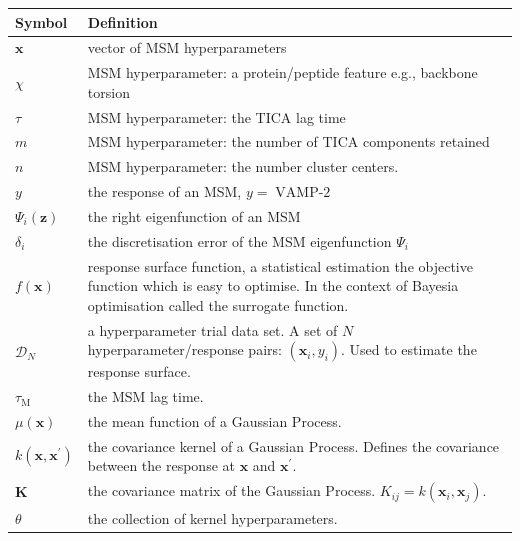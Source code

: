 \begin{table}
    \centering
    \begin{tabularx}{0.9\textwidth}{ l >{\raggedright\arraybackslash}X  } 
    \hline
        \textbf{Symbol}  &  \textbf{Definition} \\
        \hline\hline
        $\mathbf{x}$ & vector of MSM hyperparameters \\
        $\chi$ & MSM hyperparameter: a protein/peptide feature e.g., backbone torsion \\
        $\tau$ & MSM hyperparameter: the TICA lag time \\
        $m$ & MSM hyperparameter: the number of TICA components retained \\
        $n$ & MSM hyperparameter: the number cluster centers. \\
        $y$ & the response of an MSM, $y =\operatorname{VAMP-2}$ \\
        $\Psi_i(\mathbf{z})$ & the right eigenfunction of an MSM \\
        $\delta_i$ & the discretisation error of the MSM eigenfunction $\Psi_{i}$ \\
        $f(\mathbf{x})$ & response surface function, a statistical estimation the objective function 
                          which is easy to optimise. In the context of Bayesia optimisation called the 
                          surrogate function. \\
        $\mathcal{D}_{N}$ & a hyperparameter trial data set. A set of $N$ hyperparameter/response pairs: $(\mathbf{x}_{i}, y_{i})$. Used to estimate the response surface. \\
        $\tau_{\mathrm{M}}$ & the MSM lag time.  \\
        $\mu(\mathbf{x})$ & the mean function of a Gaussian Process. \\
        $k(\mathbf{x}, \mathbf{x}^{\prime})$ & the covariance kernel of a Gaussian Process. Defines the covariance between the response at $\mathbf{x}$ and $\mathbf{x}^{\prime}$. \\
        $\mathbf{K}$ & the covariance matrix of the Gaussian Process. $K_{ij} =k(\mathbf{x}_{i}, \mathbf{x}_{j})$. \\
        $\theta$ & the collection of kernel hyperparameters. \\

\end{tabularx}
\end{table}
